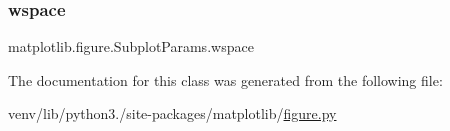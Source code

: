 \mbox{\label{classmatplotlib_1_1figure_1_1SubplotParams_a2ccba74a52f1e7a9160a8d331d95c30b}} 
\subsubsection{\texorpdfstring{wspace}{wspace}}
{\footnotesize\ttfamily matplotlib.\+figure.\+Subplot\+Params.\+wspace}



The documentation for this class was generated from the following file\+:\begin{DoxyCompactItemize}
\item 
venv/lib/python3./site-\/packages/matplotlib/\hyperlink{figure_8py}{figure.\+py}\end{DoxyCompactItemize}
